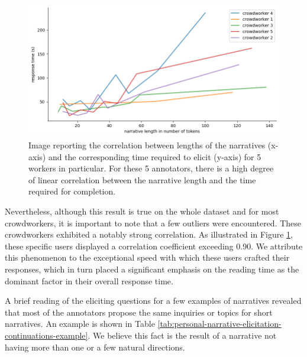 \begin{figure}[!htbp]
        \includegraphics[width=1\linewidth]{assets//imgs/dataset-high-correlation-workers.png}
        \caption{Image reporting the correlation between lengths of the narratives (x-axis) and the corresponding time required to elicit (y-axis) for 5 workers in particular. For these 5 annotators, there is a high degree of linear correlation between the narrative length and the time required for completion.}
        \label{fig:dataset-high-correlation-workers}
\end{figure}
Nevertheless, although this result is true on the whole dataset and for most crowdworkers, it is important to note that a few outliers were encountered. These crowdworkers exhibited a notably strong correlation. As illustrated in Figure \ref{fig:dataset-high-correlation-workers}, these specific users displayed a correlation coefficient exceeding 0.90. We attribute this phenomenon to the exceptional speed with which these users crafted their responses, which in turn placed a significant emphasis on the reading time as the dominant factor in their overall response time.


A brief reading of the eliciting questions for a few examples of narratives revealed that most of the annotators propose the same inquiries or topics for short narratives. An example is shown in Table \ref{tab:personal-narrative-elicitation-continuations-example}. We believe this fact is the result of a narrative not having more than one or a few natural directions.%
